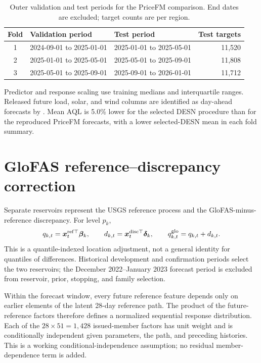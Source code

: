 \begin{table}[!htbp]
\centering
\TableStyle
\caption{Outer validation and test periods for the PriceFM comparison. End
dates are excluded; target counts are per region.}
\label{qdesn2026:tab:supp-pricefm-fold-design}
\begin{tabular}{@{}cllr@{}}
\toprule
Fold & Validation period & Test period & Test targets \\
\midrule
1 & 2024-09-01 to 2025-01-01 & 2025-01-01 to 2025-05-01 & 11,520 \\
2 & 2025-01-01 to 2025-05-01 & 2025-05-01 to 2025-09-01 & 11,808 \\
3 & 2025-05-01 to 2025-09-01 & 2025-09-01 to 2026-01-01 & 11,712 \\
\bottomrule
\end{tabular}
\end{table}

Predictor and response scaling use training medians and interquartile ranges.
Released future load, solar, and wind columns are identified as day-ahead
forecasts by \citet{qdesn-YuEtAl2026PriceFM}. Mean AQL is 5.0\% lower for the
selected DESN procedure than for the reproduced PriceFM forecasts, with a
lower selected-DESN mean in each fold summary.

\section{GloFAS reference--discrepancy correction}
\label{app:qdesn-glofas-support}

Separate reservoirs represent the USGS reference process and the
GloFAS-minus-reference discrepancy. For level \(p_k\),
\begin{equation}
q_{k,t}=\boldsymbol{x}_t^{\mathrm{ref}\top}\boldsymbol{\beta}_k,
\qquad
d_{k,t}=\boldsymbol{x}_t^{\mathrm{disc}\top}\boldsymbol{\delta}_k,
\qquad
q_{k,t}^{\mathrm{glo}}=q_{k,t}+d_{k,t}.
\label{qdesn2026:eq:supp_glofas_quantile_decomposition}
\end{equation}
This is a quantile-indexed location adjustment, not a general identity for
quantiles of differences. Historical development and confirmation periods
select the two reservoirs; the December 2022--January 2023 forecast period is
excluded from reservoir, prior, stopping, and family selection.

Within the forecast window, every future reference feature depends only on
earlier elements of the latent 28-day reference path. The product of the
future-reference factors therefore defines a normalized sequential response
distribution. Each of the \(28\times51=1{,}428\) issued-member factors has
unit weight and is conditionally independent given parameters, the path, and
preceding histories. This is a working conditional-independence assumption;
no residual member-dependence term is added.


